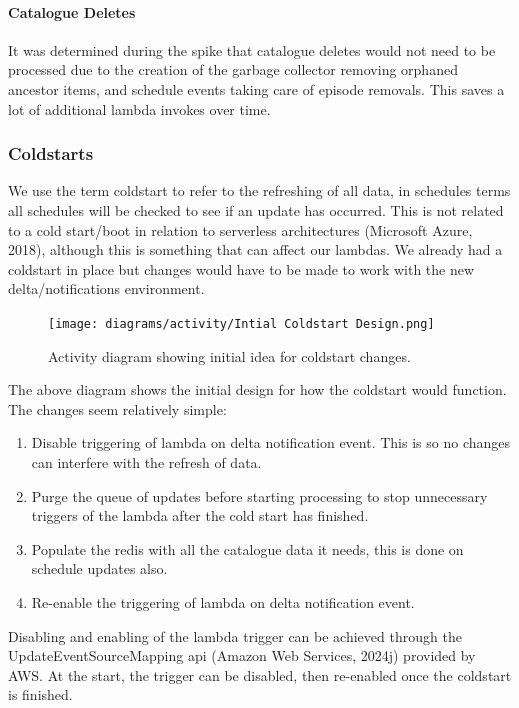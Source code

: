  \paragraph{Catalogue Deletes}
  It was determined during the spike that catalogue deletes would not need to be processed due to the creation of the garbage collector removing 
  orphaned ancestor items, and schedule events taking care of episode removals. This saves a lot of additional lambda invokes over time.

  \newpage
  \subsubsection{Coldstarts}
  We use the term coldstart to refer to the refreshing of all data, in schedules terms all schedules will be checked to see if an update has occurred.
  This is not related to a cold start/boot in relation to serverless architectures (Microsoft Azure, 2018), although this is something that can affect 
  our lambdas. We already had a coldstart in place but changes would have to be made to work with the new delta/notifications environment.

  \begin{figure}[H]
    \centering
    \texttt{[image: diagrams/activity/Intial Coldstart Design.png]}
    \caption{Activity diagram showing initial idea for coldstart changes.}
    \label{fig:initialColdstart}
  \end{figure}

  The above diagram shows the initial design for how the coldstart would function. The changes seem relatively simple:
  \begin{enumerate}
    \item Disable triggering of lambda on delta notification event. This is so no changes can interfere with the refresh of data.
    \item Purge the queue of updates before starting processing to stop unnecessary triggers of the lambda after the cold start has finished.
    \item Populate the redis with all the catalogue data it needs, this is done on schedule updates also. 
    \item Re-enable the triggering of lambda on delta notification event.
  \end{enumerate}

  Disabling and enabling of the lambda trigger can be achieved through the UpdateEventSourceMapping api (Amazon Web Services, 2024j) provided by AWS. 
  At the start, the trigger can be disabled, then re-enabled once the coldstart is finished.

